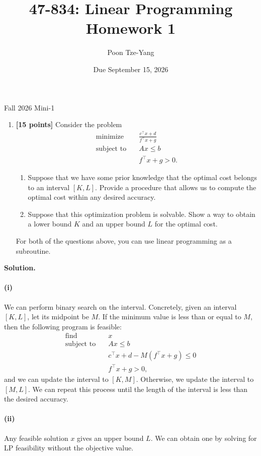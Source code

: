 \documentclass[11pt,letterpaper]{article}
\title{47-834: Linear Programming \\ Homework 1}
\author{Poon Tze-Yang}
\date{Due September 15, 2026}
\theoremstyle{definition}
\newcommand{\solution}{\medskip\noindent\textbf{Solution.}\par\medskip}
\begin{document}
\maketitle

\noindent Fall 2026 Mini-1

\begin{enumerate}
\item \textbf{[15 points]} Consider the problem
\begin{align*}
    \text{minimize} \quad & \frac{c^\top x + d}{f^\top x + g} \\
    \text{subject to} \quad & Ax \leq b \\
    & f^\top x + g > 0.
\end{align*}
\begin{enumerate}[label=(\roman*)]
\item Suppose that we have some prior knowledge that the optimal cost belongs to an interval $[K,L]$. Provide a procedure that allows us to compute the optimal cost within any desired accuracy.
\item Suppose that this optimization problem is solvable. Show a way to obtain a lower bound $K$ and an upper bound $L$ for the optimal cost.
\end{enumerate}
For both of the questions above, you can use linear programming as a subroutine.
\end{enumerate}

\solution
\paragraph{(i)} We can perform binary search on the interval.
Concretely, given an interval $[K,L]$, let its midpoint be $M$.
If the minimum value is less than or equal to $M$, then the following program is feasible:
\begin{align*}
    \text{find} \quad & x \\
    \text{subject to} \quad & Ax \leq b \\
    & c^\top x + d - M(f^\top x + g) \leq 0 \\
    & f^\top x + g > 0,
\end{align*}
and we can update the interval to $[K,M]$.
Otherwise, we update the interval to $[M,L]$.
We can repeat this process until the length of the interval is less than the desired accuracy.

\paragraph{(ii)} Any feasible solution $x$ gives an upper bound $L$. 
We can obtain one by solving for LP feasibility without the objective value.
\end{document}
